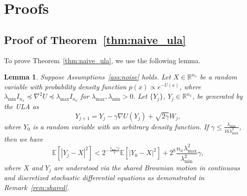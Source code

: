 \documentclass[11pt]{article}
\theoremstyle{plain}
\newtheorem{lem}[thm]{Lemma}
\theoremstyle{definition}
\theoremstyle{remark}
\begin{document}
 
\appendix

\section{Proofs}
\subsection{Proof of Theorem~\ref{thm:naive_ula}}\label{app:naive_ula}

To prove Theorem~\ref{thm:naive_ula}, we use the following lemma. 

\begin{lem}\label{lem:naive_ula}
Suppose Assumptions~\ref{ass:noise} holds.
Let $X \in \mathbb{R}^{n_x}$ be a random variable with probability density function $p(x) \propto e^{-U(x)}$, where $\lambda_{\min} I_{n_x}\preceq \nabla^2 U  \preceq  \lambda_{\max}I_{n_x}$
for $\lambda_{\max},\lambda_{\min}>0$. Let
$\{ Y_j\}$, $Y_j  \in \mathbb{R}^{n_x}$, be generated by the ULA as
\[
Y_{j+1} = Y_j - \gamma \nabla U(Y_j) + \sqrt{2\gamma} W_j,
\]
where $Y_0$ is a random variable with an arbitrary density function.
If  $\gamma \leq \frac{ \lambda_{\min}}{16\lambda_{\max}^2}$, then we have
\[
\mathbb{E} [ | Y_j - X |^2 ] < 2^{-\frac{\lambda_{\min}\gamma    j}{4}} \mathbb{E} [
| Y_0 - X |^2 
] + 
2^8 \frac{n_x \lambda_{\max}^2 }{\lambda_{\min}^2} \gamma,
\]
where $X$ and $Y_j$ are understood via the shared Brownian motion in continuous and discretized stochastic differential equations as demonstrated in Remark~\ref{rem:shared}.
\end{lem}
\end{document}
